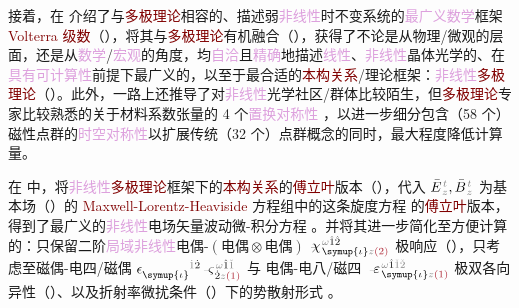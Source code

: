 接着，在  介绍了与\textcolor{Maroon}{多极理论}相容的、描述弱\textcolor{Plum}{非线性}时不变系统的\textcolor{Plum}{最广义数学}框架 \textcolor{Maroon}{Volterra 级数}（），将其与\textcolor{Maroon}{多极理论}有机融合（），获得了不论是从\textcolor{NavyBlue}{物理}/\textcolor{NavyBlue}{微观}的层面，还是从\textcolor{Plum}{数学}/\textcolor{Plum}{宏观}的角度，均\textcolor{Plum}{自洽}且\textcolor{Plum}{精确}地描述\textcolor{Plum}{线性}、\textcolor{Plum}{非线性}\textcolor{PineGreen}{晶体光学}的、在\textcolor{Plum}{具有可计算性}前提下最广义的，以至于最合适的\textcolor{Maroon}{本构关系}/\textcolor{NavyBlue}{理论框架}：\textcolor{Plum}{非线性}\textcolor{Maroon}{多极理论}（）。此外，一路上还推导了对\textcolor{Plum}{非线性}\textcolor{NavyBlue}{光学}社区/群体比较陌生，但\textcolor{Maroon}{多极理论}专家比较熟悉的关于材料系数张量的 4 个\textcolor{Plum}{置换对称性} ，以进一步细分包含（58 个）磁性点群的\textcolor{Plum}{时空对称性}以扩展传统（32 个）点群概念的同时，最大程度降低计算量。

在  中，将\textcolor{Plum}{非线性}\textcolor{Maroon}{多极理论}\textcolor{NavyBlue}{框架}下的\textcolor{Maroon}{本构关系}的\textcolor{Maroon}{傅立叶}版本（），代入 $\bar{E}^{\;\!\mathcolor{gray}{t}}_{\;\!\mathcolor{gray}{z}}, \bar{B}^{\;\!\mathcolor{gray}{t}}_{\;\!\mathcolor{gray}{z}}$ 为\textcolor{NavyBlue}{基本场}（）的 \textcolor{Maroon}{Maxwell-Lorentz-Heaviside} 方程组中的这条旋度方程  的\textcolor{Maroon}{傅立叶}版本，得到了最广义的\textcolor{Plum}{非线性}电场矢量波动微-积分方程 。并将其进一步简化至方便计算的：只保留二阶\textcolor{Plum}{局域}\textcolor{Plum}{非线性}\textcolor{NavyBlue}{电偶-$(\text{电偶}\otimes\text{电偶})$} $\xint{{}^{}_{\mathcolor{gray}{-}}}{23}{\chi}^{\;\! \mathcolor{gray}{\omega} \hat{1} \hat{2}}_{\;\! \symup{\iota} \mathcolor{gray}{z} \textcolor{Maroon}{(2)}}$ 极响应（），只考虑至\textcolor{NavyBlue}{磁偶-电四/磁偶} $\epsilon^{\hphantom{\symup{\iota}}\mathcolor{gray}{\dot{1}}\dot{2}}_{\symup{\iota}} \xint{\begin{smallmatrix} ~ \\ {}^{}_{\mathcolor{gray}{-}} \\ ~ \end{smallmatrix}}{13}{\varsigma}^{\;\! \mathcolor{gray}{\omega} \hat{1} \mathcolor{gray}{\check{1}}}_{\;\! \dot{2} \mathcolor{gray}{z} \textcolor{Maroon}{(1)}}$ 与 \textcolor{NavyBlue}{电偶-电八/磁四} $\xint{\begin{smallmatrix} ~ \\ {}^{}_{\mathcolor{gray}{-}} \\ ~ \end{smallmatrix}}{16}{\varepsilon}^{\;\! \mathcolor{gray}{\omega} \hat{1} \mathcolor{gray}{\check{1} \check{2}}}_{\;\! \symup{\iota} \mathcolor{gray}{z} \textcolor{Maroon}{(1)}}$ 极\textcolor{PineGreen}{双各向异性}（）、以及\textcolor{PineGreen}{折射率}\textcolor{NavyBlue}{微扰}条件（）下的势散射形式 。

